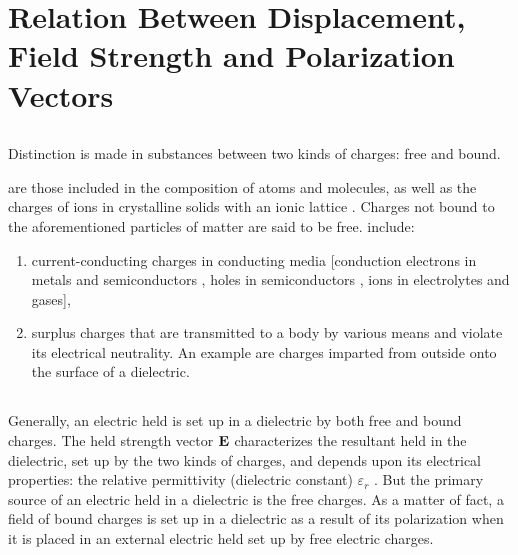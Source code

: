 \section{Relation Between Displacement, Field Strength and Polarization Vectors}
\label{sec-18.3}

\subsection{}\label{18.3.1} Distinction is made in substances between two kinds of charges: free and bound.

 are those included in the composition of atoms and molecules, as well as the charges of ions in crystalline solids with an ionic lattice . Charges not bound to the aforementioned particles of matter are said to be free.  include: 
\begin{enumerate}[label=(\alph*)]
\item current-conducting charges in conducting media [conduction electrons in metals and semiconductors , holes in semiconductors , ions in electrolytes and gases],
\item surplus charges that are transmitted to a body by various means and violate its electrical neutrality. An example are charges imparted from outside onto the surface of a dielectric. 
\end{enumerate}

\subsection{}\label{18.3.2} Generally, an electric held is set up in a dielectric by both free and bound charges. The held strength vector $\vb{E}$ characterizes the resultant held in the dielectric, set up by the two kinds of charges, and depends upon its electrical properties: the relative permittivity (dielectric constant) $\varepsilon_{r}$ . But the primary source of an electric held in a dielectric is the free charges. As a matter of fact, a field of bound charges is set up in a dielectric as a result of its polarization when it is placed in an external electric held set up by free electric charges. 

